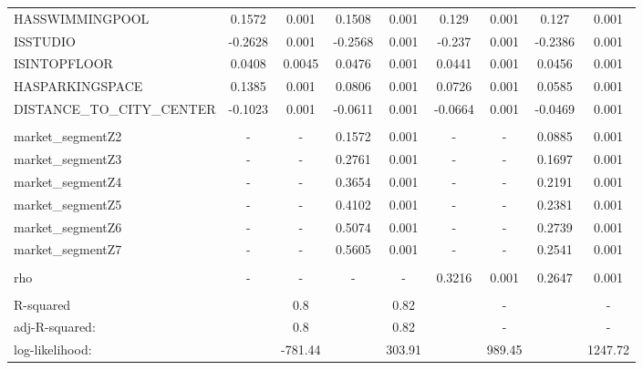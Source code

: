\documentclass[Royal,times,sageh]{sagej}
\begin{document}
\begin{table}
{\begin{tabular}[t]{lcccccccc}
\hspace{1em}HASSWIMMINGPOOL & 0.1572 & 0.001 & 0.1508 & 0.001 & 0.129 & 0.001 & 0.127 & 0.001\\
\hspace{1em}ISSTUDIO & -0.2628 & 0.001 & -0.2568 & 0.001 & -0.237 & 0.001 & -0.2386 & 0.001\\
\hspace{1em}ISINTOPFLOOR & 0.0408 & 0.0045 & 0.0476 & 0.001 & 0.0441 & 0.001 & 0.0456 & 0.001\\
\hspace{1em}HASPARKINGSPACE & 0.1385 & 0.001 & 0.0806 & 0.001 & 0.0726 & 0.001 & 0.0585 & 0.001\\
\hspace{1em}DISTANCE\_TO\_CITY\_CENTER & -0.1023 & 0.001 & -0.0611 & 0.001 & -0.0664 & 0.001 & -0.0469 & 0.001\\
\addlinespace[0.3em]
\multicolumn{9}{l}{\textbf{Market segments}}\\
\hspace{1em}market\_segmentZ2 & - & - & 0.1572 & 0.001 & - & - & 0.0885 & 0.001\\
\hspace{1em}market\_segmentZ3 & - & - & 0.2761 & 0.001 & - & - & 0.1697 & 0.001\\
\hspace{1em}market\_segmentZ4 & - & - & 0.3654 & 0.001 & - & - & 0.2191 & 0.001\\
\hspace{1em}market\_segmentZ5 & - & - & 0.4102 & 0.001 & - & - & 0.2381 & 0.001\\
\hspace{1em}market\_segmentZ6 & - & - & 0.5074 & 0.001 & - & - & 0.2739 & 0.001\\
\hspace{1em}market\_segmentZ7 & - & - & 0.5605 & 0.001 & - & - & 0.2541 & 0.001\\
\addlinespace[0.3em]
\multicolumn{9}{l}{\textbf{Spatial lag parameter}}\\
\hspace{1em}rho & - & - & - & - & 0.3216 & 0.001 & 0.2647 & 0.001\\
\addlinespace[0.3em]
\multicolumn{9}{l}{\textbf{Model diagnostics}}\\
\hspace{1em}R-squared &  & 0.8 &  & 0.82 &  & - &  & -\\
\hspace{1em}adj-R-squared: &  & 0.8 &  & 0.82 &  & - &  & -\\
\hspace{1em}log-likelihood: &  & -781.44 &  & 303.91 &  & 989.45 &  & 1247.72\\
\bottomrule
\end{tabular}}
\end{table}
\end{document}
